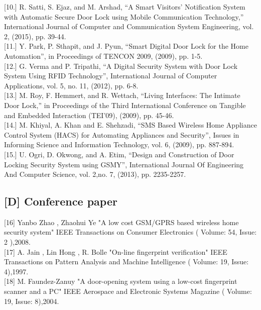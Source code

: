 \documentclass[twoside,a4paper,16pt]{book}
\begin{document}
{[10.] R. Satti, S. Ejaz, and M. Arshad, “A Smart Visitors’ Notification System with Automatic Secure Door Lock using Mobile Communication Technology,” International Journal of Computer and Communication System Engineering, vol. 2, (2015), pp. 39-44.\\

[11.] Y. Park, P. Sthapit, and J. Pyun, “Smart Digital Door Lock for the Home Automation”, in Proceedings of TENCON 2009, (2009), pp. 1-5.\\

[12.]	G. Verma and P. Tripathi, “A Digital Security System with Door Lock System Using RFID Technology”, International Journal of Computer Applications, vol. 5, no. 11, (2012), pp. 6-8.\\

[13.]	M. Roy, F. Hemmert, and R. Wettach, “Living Interfaces: The Intimate Door Lock,” in Proceedings of the Third International Conference on Tangible and Embedded Interaction (TEI'09), (2009), pp. 45-46.\\

[14.]	M. Khiyal, A. Khan and E. Shehzadi, “SMS Based Wireless Home Appliance Control System (HACS) for Automating Appliances and Security”, Issues in Informing Science and Information Technology, vol. 6, (2009), pp. 887-894.\\

[15.]	U. Ogri, D. Okwong, and A. Etim, “Design and Construction of Door Locking Security System using GSMY”, International Journal Of Engineering And Computer Science, vol. 2,no. 7, (2013), pp. 2235-2257.\\




\subsection{[D] Conference paper}


[16]	Yanbo Zhao ,  Zhaohui Ye "A low cost GSM/GPRS based wireless home security system" IEEE Transactions on Consumer Electronics ( Volume: 54, Issue: 2 ),2008.\\

{[17]}	A. Jain , Lin Hong , R. Bolle "On-line fingerprint verification" IEEE Transactions on Pattern Analysis and Machine Intelligence ( Volume: 19, Issue: 4),1997.\\

{[18]}	M. Faundez-Zanuy "A door-opening system using a low-cost fingerprint scanner and a PC" IEEE Aerospace and Electronic Systems Magazine ( Volume: 19, Issue: 8),2004.\\

}
\end{document}
